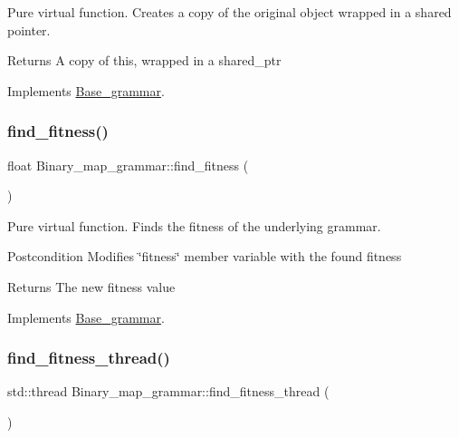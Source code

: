 Pure virtual function. Creates a copy of the original object wrapped in a shared pointer. 

\begin{DoxyReturn}{Returns}
A copy of this, wrapped in a shared\+\_\+ptr 
\end{DoxyReturn}


Implements \mbox{\hyperlink{classBase__grammar_a46bdb324d10ba87d7faf654e8d041b38}{Base\+\_\+grammar}}.

\mbox{\label{classBinary__map__grammar_ac582d7d468099817506ae54b346de08d}} 
\subsubsection{\texorpdfstring{find\_fitness()}{find\_fitness()}}
{\footnotesize\ttfamily float Binary\+\_\+map\+\_\+grammar\+::find\+\_\+fitness (\begin{DoxyParamCaption}{ }\end{DoxyParamCaption})\hspace{0.3cm}{\ttfamily [virtual]}}



Pure virtual function. Finds the fitness of the underlying grammar. 

\begin{DoxyPostcond}{Postcondition}
Modifies \char`\"{}fitness\char`\"{} member variable with the found fitness 
\end{DoxyPostcond}
\begin{DoxyReturn}{Returns}
The new fitness value 
\end{DoxyReturn}


Implements \mbox{\hyperlink{classBase__grammar_a4a302ebcebff2c63ff92eed93cfb5323}{Base\+\_\+grammar}}.

\mbox{\label{classBinary__map__grammar_a331b929d28960fb4fda2bf9f863349f1}} 
\subsubsection{\texorpdfstring{find\_fitness\_thread()}{find\_fitness\_thread()}}
{\footnotesize\ttfamily std\+::thread Binary\+\_\+map\+\_\+grammar\+::find\+\_\+fitness\+\_\+thread (\begin{DoxyParamCaption}{ }\end{DoxyParamCaption})\hspace{0.3cm}{\ttfamily [virtual]}}



